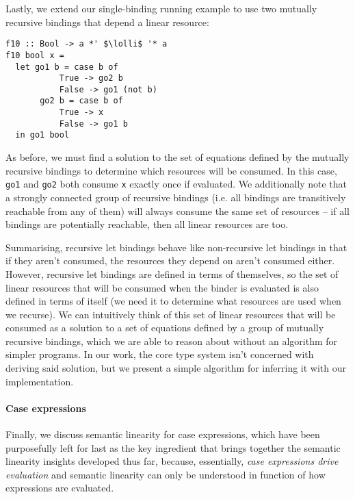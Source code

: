 \documentclass[acmsmall,review]{acmart}
\newcommand{\incode}[1]{\lstinline{#1}}
\newcommand{\parawith}[1]{\paragraph{\emph{#1}}}
\newcommand{\lolli}{\multimap}
\begin{document}
Lastly, we extend our single-binding running example to use two mutually recursive bindings that
depend a linear resource:
\begin{notyet}
\begin{lstlisting}
f10 :: Bool -> a *' $\lolli$ '* a
f10 bool x =
  let go1 b = case b of
           True -> go2 b
           False -> go1 (not b)
       go2 b = case b of
           True -> x
           False -> go1 b
  in go1 bool
\end{lstlisting}
\end{notyet}
As before, we must find a solution to the set of equations defined by the
mutually recursive bindings to determine which resources will be consumed.
In this case, \incode{go1} and \incode{go2} both consume \incode{x} exactly once if evaluated.
We additionally note that a strongly connected group of recursive bindings
(i.e. all bindings are transitively reachable from any of them) will always
consume the same set of resources -- if all bindings are potentially reachable,
then all linear resources are too.

Summarising, recursive let bindings behave like non-recursive let bindings in
that if they aren't consumed, the resources they depend on aren't consumed
either.  However, recursive let bindings are defined in terms of themselves, so
the set of linear resources that will be consumed when the binder is evaluated
is also defined in terms of itself (we need it to determine what resources are
used when we recurse). We can intuitively think of this set of linear resources
that will be consumed as a solution to a set of equations defined by a group of
mutually recursive bindings, which we are able to reason about without an
algorithm for simpler programs. In our work, the core type system isn't
concerned with deriving said solution, but we present a simple algorithm for
inferring it with our implementation.

\paragraph{Case expressions}
Finally, we discuss semantic linearity for case expressions, which have been
purposefully left for last as the key ingredient that brings together the
semantic linearity insights developed thus far, because, essentially,
\emph{case expressions drive evaluation} and semantic linearity can only be
understood in function of how expressions are evaluated.
\end{document}
